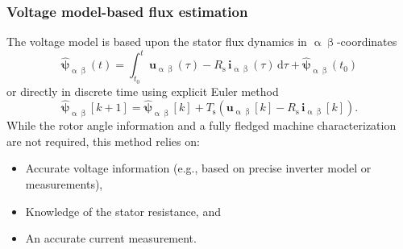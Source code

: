 \begin{frame}
    \frametitle{Voltage model-based flux estimation}
    The voltage model is based upon the stator flux dynamics in $\upalpha\upbeta$-coordinates
    \begin{equation}
        \hat{\bm{\psi}}_{\upalpha\upbeta}(t) = \int_{t_0}^t \bm{u}_{\upalpha\upbeta}(\tau) - R_\mathrm{s}\,\bm{i}_{\upalpha\upbeta}(\tau) \, \mathrm{d}\tau + \hat{\bm{\psi}}_{\upalpha\upbeta}(t_0)
    \end{equation}\pause%
    or directly in discrete time using explicit Euler method
    \begin{equation}
        \hat{\bm{\psi}}_{\upalpha\upbeta}[k+1] = \hat{\bm{\psi}}_{\upalpha\upbeta}[k] + T_\mathrm{s}\left(\bm{u}_{\upalpha\upbeta}[k] - R_\mathrm{s}\,\bm{i}_{\upalpha\upbeta}[k]\right).
    \end{equation}\pause%
    While the rotor angle information and a fully fledged machine characterization are not required, this method relies on:
    \begin{itemize}
        \item Accurate voltage information (e.g., based on precise inverter model or measurements), \pause
        \item Knowledge of the stator resistance, and \pause
        \item An accurate current measurement.
    \end{itemize}
\end{frame}


